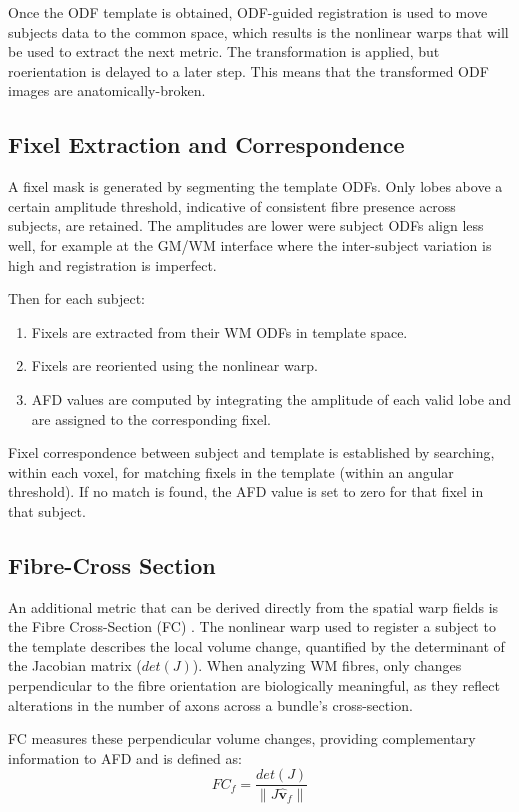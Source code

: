 Once the ODF template is obtained, ODF-guided registration is used to move subjects data to the common space, which results is the nonlinear warps that will be used to extract the next metric. The transformation is applied, but roerientation is delayed to a later step. This means that the transformed ODF images are anatomically-broken.

\subsection{Fixel Extraction and Correspondence}
A fixel mask is generated by segmenting the template ODFs. Only lobes above a certain amplitude threshold, indicative of consistent fibre presence across subjects, are retained. The amplitudes are lower were subject ODFs align less well, for example at the GM/WM interface where the inter-subject variation is high and registration is imperfect.

Then for each subject:

\begin{enumerate}
    \item Fixels are extracted from their WM ODFs in template space.
    \item Fixels are reoriented using the nonlinear warp.
    \item AFD values are computed by integrating the amplitude of each valid lobe and are assigned to the corresponding fixel.
\end{enumerate}

Fixel correspondence between subject and template is established by searching, within each voxel, for matching fixels in the template (within an angular threshold). If no match is found, the AFD value is set to zero for that fixel in that subject.

\subsection{Fibre-Cross Section}
An additional metric that can be derived directly from the spatial warp fields is the Fibre Cross-Section (FC) \cite{Raffelt2017}. The nonlinear warp used to register a subject to the template describes the local volume change, quantified by the determinant of the Jacobian matrix ($det( J)$). When analyzing WM fibres, only changes perpendicular to the fibre orientation are biologically meaningful, as they reflect alterations in the number of axons across a bundle's cross-section.

FC measures these perpendicular volume changes, providing complementary information to AFD and is defined as:
\begin{equation}
FC_f = \frac{det( J)}{\lVert J\hat{\boldsymbol v}_f\rVert}
\end{equation}

